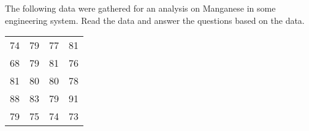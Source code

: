 \documentclass[11pt]{article}\usepackage[]{graphicx}\usepackage[]{color}
\begin{document}
	\pagestyle{fancy} 
	
The following data were gathered for an analysis on Manganese in some engineering system. Read the data and answer the questions based on the data. 
\begin{center}
			\begin{tabular}{cccc}
			74& 79& 77& 81\\         
		    68& 79& 81& 76\\         
		    81& 80& 80& 78\\         
		    88& 83& 79& 91\\         
		    79& 75& 74& 73\\ 

			\end{tabular}
\end{center}
\end{document}
